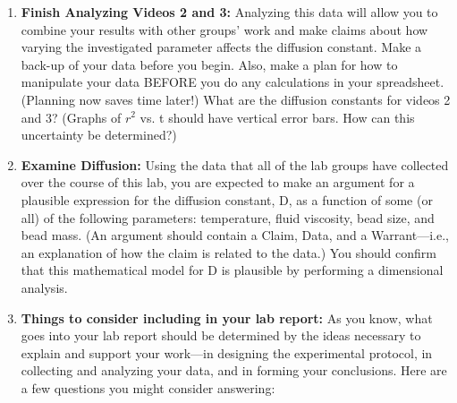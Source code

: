 \begin{enumerate}
\item \textbf{Finish Analyzing Videos 2 and 3:} Analyzing this data will allow you to combine your results with other groups' work and make claims about how varying the investigated parameter affects the diffusion constant. Make a back-up of your data before you begin. Also, make a plan for how to manipulate your data BEFORE you do any calculations in your spreadsheet. (Planning now saves time later!) What are the diffusion constants for videos 2 and 3? (Graphs of $r^{2}$ vs. t should have vertical error bars. How can this uncertainty be determined?)
\item \textbf{Examine Diffusion:} Using the data that all of the lab groups have collected over the course of this lab, you are expected to make an argument for a plausible expression for the diffusion constant, D, as a function of some (or all) of the following parameters: temperature, fluid viscosity, bead size, and bead mass. (An argument should contain a Claim, Data, and a Warrant—i.e., an explanation of how the claim is related to the data.) You should confirm that this mathematical model for D is plausible by performing a dimensional analysis.
\item \textbf{Things to consider including in your lab report:} As you know, what goes into your lab report should be determined by the ideas necessary to explain and support your work—in designing the experimental protocol, in collecting and analyzing your data, and in forming your conclusions. Here are a few questions you might consider answering:

\end{enumerate}

